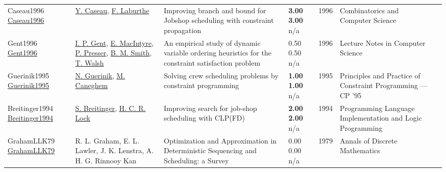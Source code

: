 {\begin{longtable}{p{3cm}p{5cm}p{10cm}p{1cm}rp{2.5cm}l}
Caseau1996 \href{http://dx.doi.org/10.1007/3-540-61576-8_79}{Caseau1996} & \hyperref[auth:a301]{Y. Caseau}, \hyperref[auth:a1513]{F. Laburthe} & Improving branch and bound for Jobshop scheduling with constraint propagation & \noindent{}\textbf{3.00} \textbf{3.00} n/a & 1996 & Combinatorics and Computer Science & \cite{Caseau1996}\\
Gent1996 \href{http://dx.doi.org/10.1007/3-540-61551-2_74}{Gent1996} & \hyperref[auth:a1871]{I. P. Gent}, \hyperref[auth:a1872]{E. MacIntyre}, \hyperref[auth:a1873]{P. Presser}, \hyperref[auth:a1053]{B. M. Smith}, \hyperref[auth:a276]{T. Walsh} & An empirical study of dynamic variable ordering heuristics for the constraint satisfaction problem & \noindent{}0.50 0.50 n/a & 1996 & Lecture Notes in Computer Science & \cite{Gent1996}\\
Guerinik1995 \href{http://dx.doi.org/10.1007/3-540-60299-2_29}{Guerinik1995} & \hyperref[auth:a1660]{N. Guerinik}, \hyperref[auth:a1661]{M. Caneghem} & Solving crew scheduling problems by constraint programming & \noindent{}\textbf{1.00} \textbf{1.00} n/a & 1995 & Principles and Practice of Constraint Programming — CP '95 & \cite{Guerinik1995}\\
Breitinger1994 \href{http://dx.doi.org/10.1007/3-540-58402-1_20}{Breitinger1994} & \hyperref[auth:a695]{S. Breitinger}, \hyperref[auth:a696]{H. C. R. Lock} & Improving search for job-shop scheduling with CLP(FD) & \noindent{}\textbf{2.00} \textbf{2.00} n/a & 1994 & Programming Language Implementation and Logic Programming & \cite{Breitinger1994}\\
GrahamLLK79 \href{http://dx.doi.org/10.1016/s0167-5060(08)70356-x}{GrahamLLK79} & R. L. Graham, E. L. Lawler, J. K. Lenstra, A. H. G. Rinnooy Kan & \cellcolor{green!10}Optimization and Approximation in Deterministic Sequencing and Scheduling: a Survey & \noindent{}\textcolor{black!50}{0.00} \textcolor{black!50}{0.00} n/a & 1979 & Annals of Discrete Mathematics & \cite{GrahamLLK79}\\
\end{longtable}
}

